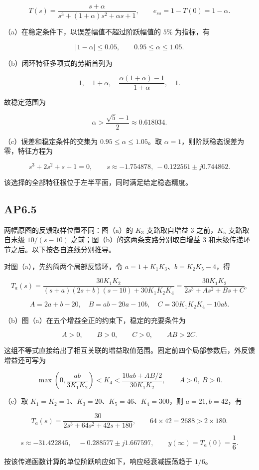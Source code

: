 \documentclass[UTF8,12pt]{ctexart}
\begin{document}
\[
T(s)=\frac{s+\alpha}{s^3+(1+\alpha)s^2+\alpha s+1},\qquad e_{ss}=1-T(0)=1-\alpha.
\]

（a）在稳定条件下，以误差幅值不超过阶跃幅值的 $5\%$ 为指标，有

\[
|1-\alpha|\le0.05,\qquad0.95\le\alpha\le1.05.
\]

（b）闭环特征多项式的劳斯首列为

\[
1,\quad1+\alpha,\quad\frac{\alpha(1+\alpha)-1}{1+\alpha},\quad1.
\]

故稳定范围为

\[
\alpha>\frac{\sqrt5-1}{2}\approx0.618034.
\]

（c）误差和稳定条件的交集为 $0.95\le\alpha\le1.05$。取 $\alpha=1$，则阶跃稳态误差为零，特征方程为

\[
s^3+2s^2+s+1=0,\qquad s\approx-1.754878,\ -0.122561\pm j0.744862.
\]

该选择的全部特征根位于左半平面，同时满足给定稳态精度。


\subsection*{AP6.5}
两幅原图的反馈取样位置不同：图（a）的 $K_3$ 支路取自增益 $3$ 之前，$K_5$ 支路取自末级 $10/(s-10)$ 之前；图（b）的这两条支路分别取自增益 $3$ 和末级传递环节之后。以下按各自连线分别推导。

对图（a），先约简两个局部反馈环，令 $a=1+K_1K_3$、$b=K_2K_5-4$，得

\[
T_a(s)=\frac{30K_1K_2}{(s+a)(2s+b)(s-10)+30K_1K_2K_4}=\frac{30K_1K_2}{2s^3+A s^2+B s+C},
\]

\[
A=2a+b-20,\quad B=ab-20a-10b,\quad C=30K_1K_2K_4-10ab.
\]

（b）图（a）在五个增益全正的约束下，稳定的充要条件为

\[
A>0,\qquad B>0,\qquad C>0,\qquad AB>2C.
\]

这组不等式直接给出了相互关联的增益取值范围。固定前四个局部参数后，外反馈增益还可写为

\[
\max\left(0,\frac{ab}{3K_1K_2}\right)<K_4<\frac{10ab+AB/2}{30K_1K_2},\qquad A>0,\ B>0.
\]

（c）取 $K_1=K_2=1$、$K_3=20$、$K_5=46$、$K_4=300$，则 $a=21,b=42$，有

\[
T_a(s)=\frac{30}{2s^3+64s^2+42s+180},\qquad64\times42=2688>2\times180.
\]

\[
s\approx-31.422845,\quad-0.288577\pm j1.667597,\qquad y(\infty)=T_a(0)=\frac16.
\]

按该传递函数计算的单位阶跃响应如下，响应经衰减振荡趋于 $1/6$。
\end{document}

